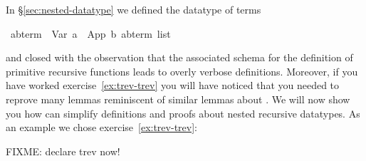 \begin{isabelle}%
%
\begin{isamarkuptext}%
In \S\ref{sec:nested-datatype} we defined the datatype of terms%
\end{isamarkuptext}%
\ {\isacharparenleft}{\isacharprime}a{\isacharcomma}{\isacharprime}b{\isacharparenright}{\isachardoublequote}term{\isachardoublequote}\ {\isacharequal}\ Var\ {\isacharprime}a\ {\isacharbar}\ App\ {\isacharprime}b\ {\isachardoublequote}{\isacharparenleft}{\isacharprime}a{\isacharcomma}{\isacharprime}b{\isacharparenright}term\ list{\isachardoublequote}%
\begin{isamarkuptext}%
\noindent
and closed with the observation that the associated schema for the definition
of primitive recursive functions leads to overly verbose definitions. Moreover,
if you have worked exercise~\ref{ex:trev-trev} you will have noticed that
you needed to reprove many lemmas reminiscent of similar lemmas about
. We will now show you how  can simplify
definitions and proofs about nested recursive datatypes. As an example we
chose exercise~\ref{ex:trev-trev}:

FIXME: declare trev now!%
\end{isamarkuptext}%
\end{isabelle}%
